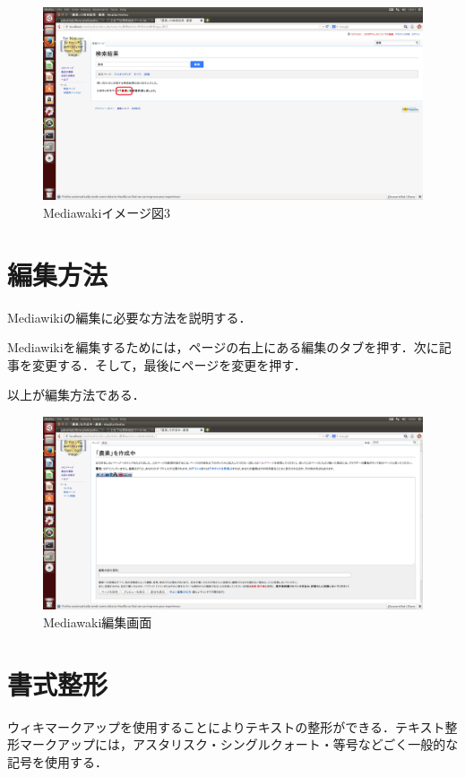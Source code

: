 \begin{figure}[htb]
\centering
\includegraphics[width=15cm]{sakusei}
\caption{Mediawakiイメージ図3}\label{図}
\end{figure}



\section{編集方法}
Mediawikiの編集に必要な方法を説明する．

Mediawikiを編集するためには，ページの右上にある編集のタブを押す．次に記事を変更する．そして，最後にページを変更を押す．

以上が編集方法である．

\begin{figure}[htb]
\centering
\includegraphics[width=15cm]{ubuntu}
\caption{Mediawaki編集画面}\label{図}
\end{figure}


\clearpage

\section{書式整形}
ウィキマークアップを使用することによりテキストの整形ができる．テキスト整形マークアップには，アスタリスク・シングルクォート・等号などごく一般的な記号を使用する\cite{help}．

